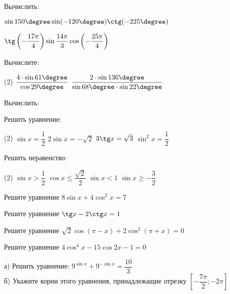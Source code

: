 %
%

\begin{class}[number=1]
	\begin{listofex}
		\item Вычислить:
		\begin{enumcols}[itemcolumns=2]
			\item \( \sin150\degree\sin(-120\degree)\ctg(-225\degree) \)
			\item \( \tg\left( -\dfrac{17\pi}{4} \right)\sin\dfrac{14\pi}{3} \cos\left( -\dfrac{25\pi}{4}\right)\ \)
		\end{enumcols}
		\item Вычислите:
		\begin{tasks}(2)
			\task \(\dfrac{4 \cdot \sin61\degree}{\cos29\degree}\)
			\task \(\dfrac{2 \cdot \sin136\degree}{\sin68\degree \cdot \sin22\degree}\)
		\end{tasks}
		\item Вычислить:
		\begin{enumcols}[itemcolumns=1]
			\item \exercise{1117}
			\item \exercise{1119}
		\end{enumcols}
		\item Решить уравнение:
		\begin{tasks}(2)
			\task \( \sin x = \dfrac{1}{2} \)
			\task \( 2\sin x = -\sqrt{2} \)
			\task \( 3\tg x = \sqrt{3} \)
			\task \( \sin^2 x = \dfrac{1}{2} \)
		\end{tasks}
		\item Решить неравенство:
		\begin{tasks}(2)
			\task \( \sin x > \dfrac{1}{2} \)
			\task \( \cos x \le \dfrac{\sqrt{2}}{2} \)
			\task \( \sin x < 1 \)
			\task \( \sin x \ge -\dfrac{3}{2}\)
		\end{tasks}
		\item  Решите уравнение \( 8\sin x + 4\cos^2 x = 7 \)
		\item  Решите уравнение \( \tg x-2\ctg x=1 \)
		\item  Решите уравнение \( \sqrt{2}\cos {(\pi-x)} + 2\cos^2{(\pi+x)}=0 \)
		\item  Решите уравнение \( 4\cos^4 x - 15\cos 2x -1= 0 \)
		\item а) Решить уравнение: \( 9^{\sin x}+9^{-\sin x}=\dfrac{10}{3} \)\\
		б) Укажите корни этого уравнения, принадлежащие отрезку \( \left[ -\dfrac{7\pi}{2};-2\pi \right] \)
	\end{listofex}
\end{class}

